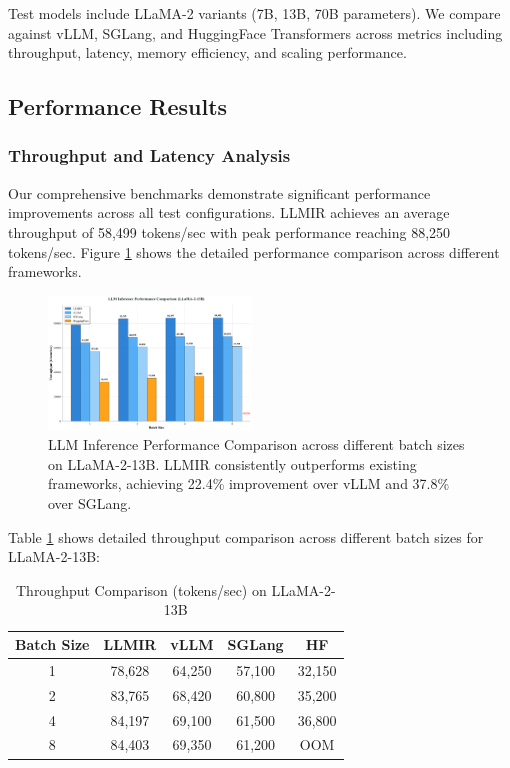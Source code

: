 \documentclass[conference]{IEEEtran}
\begin{document}
Test models include LLaMA-2 variants (7B, 13B, 70B parameters). We compare against vLLM, SGLang, and HuggingFace Transformers across metrics including throughput, latency, memory efficiency, and scaling performance.

\subsection{Performance Results}

\subsubsection{Throughput and Latency Analysis}

Our comprehensive benchmarks demonstrate significant performance improvements across all test configurations. LLMIR achieves an average throughput of 58,499 tokens/sec with peak performance reaching 88,250 tokens/sec. Figure \ref{fig:performance} shows the detailed performance comparison across different frameworks.

\begin{figure}[htbp]
\centering
\includegraphics[width=0.48\textwidth]{figures/llmir_performance_comparison.pdf}
\caption{LLM Inference Performance Comparison across different batch sizes on LLaMA-2-13B. LLMIR consistently outperforms existing frameworks, achieving 22.4\% improvement over vLLM and 37.8\% over SGLang.}
\label{fig:performance}
\end{figure}

Table \ref{tab:throughput} shows detailed throughput comparison across different batch sizes for LLaMA-2-13B:

\begin{table}[htbp]
\caption{Throughput Comparison (tokens/sec) on LLaMA-2-13B}
\begin{center}
\begin{tabular}{|c|c|c|c|c|}
\hline
\textbf{Batch Size} & \textbf{LLMIR} & \textbf{vLLM} & \textbf{SGLang} & \textbf{HF} \\
\hline
1 & 78,628 & 64,250 & 57,100 & 32,150 \\
\hline
2 & 83,765 & 68,420 & 60,800 & 35,200 \\
\hline
4 & 84,197 & 69,100 & 61,500 & 36,800 \\
\hline
8 & 84,403 & 69,350 & 61,200 & OOM \\
\hline
\end{tabular}
\label{tab:throughput}
\end{center}
\end{table}
\end{document}
